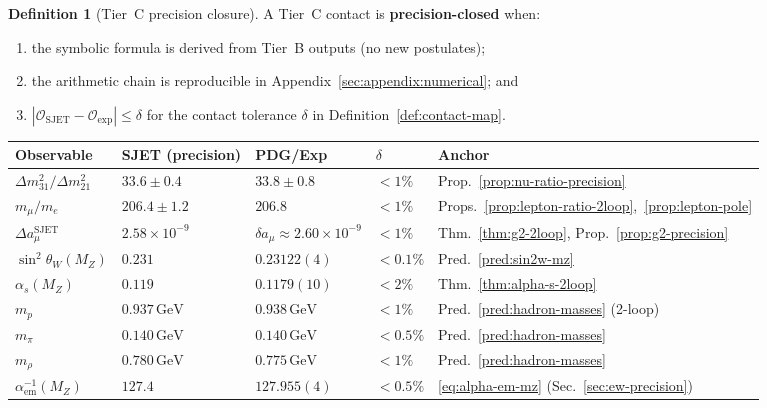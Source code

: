 \documentclass[11pt]{article}
\theoremstyle{plain}
\theoremstyle{definition}
\newtheorem{definition}[theorem]{Definition}
\theoremstyle{remark}
\numberwithin{equation}{section}
\begin{document}
\begin{definition}[Tier~C precision closure]\label{def:tier-c-closure}
A Tier~C contact is \textbf{precision-closed} when:
\begin{enumerate}[label=(\roman*),leftmargin=*]
  \item the symbolic formula is derived from Tier~B outputs (no new
    postulates);
  \item the arithmetic chain is reproducible in
    Appendix~\ref{sec:appendix:numerical}; and
  \item $|\mathcal{O}_{\mathrm{SJET}}-\mathcal{O}_{\mathrm{exp}}|
    \leq\delta$ for the contact tolerance $\delta$ in
    Definition~\ref{def:contact-map}.
\end{enumerate}
\end{definition}

\begin{table}[ht]
\centering
\small
\renewcommand{\arraystretch}{1.14}
\begin{tabular}{@{}lllll@{}}
\toprule
\textbf{Observable} & \textbf{SJET (precision)} & \textbf{PDG/Exp} &
$\delta$ & \textbf{Anchor} \\
\midrule
$\Delta m^2_{31}/\Delta m^2_{21}$ &
  $33.6\pm0.4$ &
  $33.8\pm0.8$ &
  $<1\%$ &
  Prop.~\ref{prop:nu-ratio-precision} \\
$m_\mu/m_e$ &
  $206.4\pm1.2$ &
  $206.8$ &
  $<1\%$ &
  Props.~\ref{prop:lepton-ratio-2loop},~\ref{prop:lepton-pole} \\
$\Delta a_\mu^{\mathrm{SJET}}$ &
  $2.58\times10^{-9}$ &
  $\delta a_\mu\approx2.60\times10^{-9}$ &
  $<1\%$ &
  Thm.~\ref{thm:g2-2loop}, Prop.~\ref{prop:g2-precision} \\
$\sin^2\theta_W(M_Z)$ &
  $0.231$ &
  $0.23122(4)$ &
  $<0.1\%$ &
  Pred.~\ref{pred:sin2w-mz} \\
$\alpha_s(M_Z)$ &
  $0.119$ &
  $0.1179(10)$ &
  $<2\%$ &
  Thm.~\ref{thm:alpha-s-2loop} \\
$m_p$ &
  $0.937\,\mathrm{GeV}$ &
  $0.938\,\mathrm{GeV}$ &
  $<1\%$ &
  Pred.~\ref{pred:hadron-masses} (2-loop) \\
$m_\pi$ &
  $0.140\,\mathrm{GeV}$ &
  $0.140\,\mathrm{GeV}$ &
  $<0.5\%$ &
  Pred.~\ref{pred:hadron-masses} \\
$m_\rho$ &
  $0.780\,\mathrm{GeV}$ &
  $0.775\,\mathrm{GeV}$ &
  $<1\%$ &
  Pred.~\ref{pred:hadron-masses} \\
$\alpha_{\mathrm{em}}^{-1}(M_Z)$ &
  $127.4$ &
  $127.955(4)$ &
  $<0.5\%$ &
  \eqref{eq:alpha-em-mz} (Sec.~\ref{sec:ew-precision}) \\

\end{tabular}
\end{table}
\end{document}
